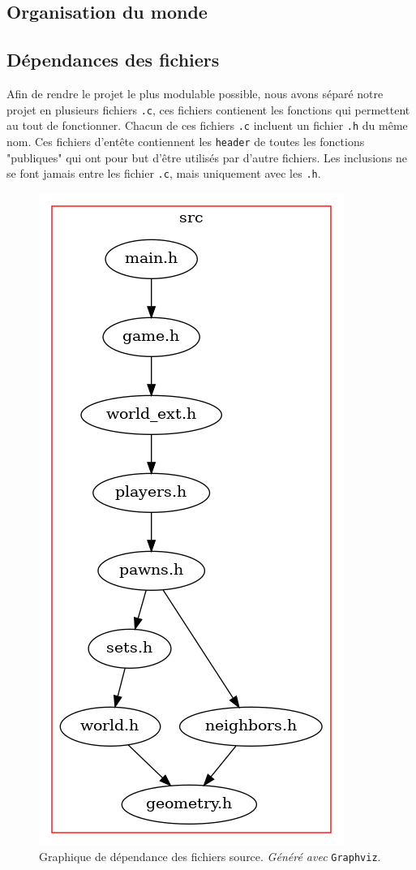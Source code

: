     \subsection{Organisation du monde}
    \subsection{Dépendances des fichiers}\label{part:graph_src}
        Afin de rendre le projet le plus modulable possible, nous avons séparé notre projet en plusieurs fichiers \texttt{.c}, ces fichiers contienent les fonctions qui permettent au tout de fonctionner. Chacun de ces fichiers \texttt{.c} incluent un fichier \texttt{.h} du même nom. Ces fichiers d'entête contiennent les \texttt{header} de toutes les fonctions "publiques" qui ont pour but d'être utilisés par d'autre fichiers. Les inclusions ne se font jamais entre les fichier \texttt{.c}, mais uniquement avec les \texttt{.h}.
        
        \begin{figure}[H]
            \centering
            \includegraphics[scale=0.4]{img/graph_src.png}
            \caption{Graphique de dépendance des fichiers source. \textit{Généré avec} \texttt{Graphviz}.}
            \label{fig:graph_src}
        \end{figure}

